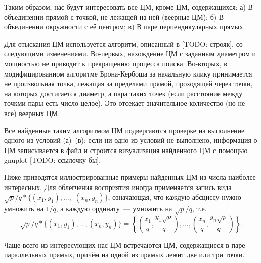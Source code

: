 \documentclass[12pt]{article}
\begin{document}
Таким образом, нас будут интересовать все ЦМ, кроме ЦМ, содержащихся:
а) В объединении прямой с точкой, не лежащей на ней (веерные ЦМ);
б) В объединении окружности с её центром;
в) В паре перпендикулярных прямых.

Для отыскания ЦМ используется алгоритм, описанный в [TODO: строяк],
со следующими изменениями.
Во-первых, нахождение ЦМ с заданным диаметром и мощностью не приводит к прекращению процесса поиска.
Во-вторых, в модифицированном алгоритме Брона-Кербоша за начальную клику
принимается не произвольная точка, лежащая за пределами прямой, проходящей через точки,
на которых достигается диаметр, а пара таких точек (если расстояние между точкми пары есть число целое).
Это отсекает значительное количество (но не все) веерных ЦМ.

Все найденные таким алгоритмом ЦМ подвергаются проверке на выполнение одного из условий (а)--(в);
если ни одно из условий не выполнено, информация о ЦМ записывается в файл и строится визуализация найденного ЦМ с помощью gnuplot
[TODO: ссылочку бы].

Ниже приводятся иллюстрированные примеры найденных ЦМ из числа наиболее интересных.
Для облегчения восприятия иногда применяется запись вида
$\sqrt{p}/q * \{ (x_1,y_1), ...,$ $ (x_n, y_n)  \}$,
означающая, что каждую абсциссу нужно умножить на $1/q$,
а каждую ординату~--- умножить на $\sqrt{p}/q$, т.е.
$$
	\sqrt{p}/q * \{ (x_1,y_1), ..., (x_n, y_n)  \}
	=
	\left\{ \left(\frac{x_1}{q},\frac{y_1\sqrt{p}}{q}\right), ..., \left(\frac{x_n}{q},\frac{y_n\sqrt{p}}{q}\right)  \right\}
	.
$$

Чаще всего из интересующих нас ЦМ встречаются ЦМ, содержащиеся в паре параллельных прямых,
причём на одной из прямых лежит две или три точки.
\end{document}
